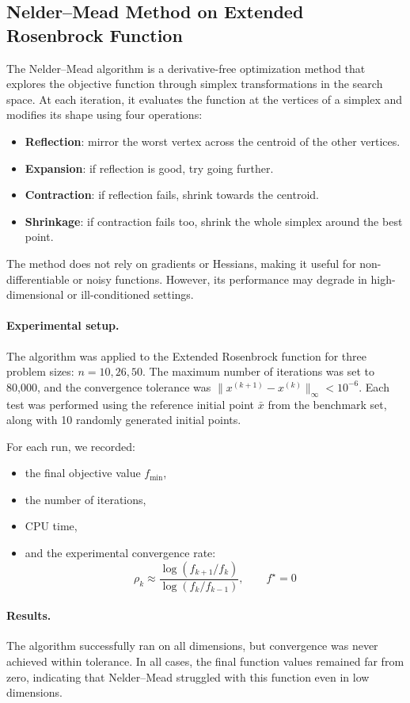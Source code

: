 \documentclass[a4paper,12pt]{article}
\begin{document}
	\subsection{Nelder–Mead Method on Extended Rosenbrock Function}
	
	The Nelder–Mead algorithm is a derivative-free optimization method that explores the objective function through simplex transformations in the search space. At each iteration, it evaluates the function at the vertices of a simplex and modifies its shape using four operations:
	\begin{itemize}[nosep]
		\item \textbf{Reflection}: mirror the worst vertex across the centroid of the other vertices.
		\item \textbf{Expansion}: if reflection is good, try going further.
		\item \textbf{Contraction}: if reflection fails, shrink towards the centroid.
		\item \textbf{Shrinkage}: if contraction fails too, shrink the whole simplex around the best point.
	\end{itemize}
	The method does not rely on gradients or Hessians, making it useful for non-differentiable or noisy functions. However, its performance may degrade in high-dimensional or ill-conditioned settings.
	
	\paragraph{Experimental setup.}
	The algorithm was applied to the Extended Rosenbrock function for three problem sizes: \(n = 10, 26, 50\). The maximum number of iterations was set to 80,000, and the convergence tolerance was \( \|x^{(k+1)} - x^{(k)}\|_\infty < 10^{-6} \). Each test was performed using the reference initial point \( \bar{x} \) from the benchmark set, along with 10 randomly generated initial points.
	
	For each run, we recorded:
	\begin{itemize}[nosep]
		\item the final objective value \( f_{\min} \),
		\item the number of iterations,
		\item CPU time,
		\item and the experimental convergence rate:
		\[
		\rho_k \approx \frac{\log(f_{k+1}/f_k)}{\log(f_k / f_{k-1})}, \qquad f^\star = 0
		\]
	\end{itemize}
	\newpage
	\paragraph{Results.}
	The algorithm successfully ran on all dimensions, but convergence was never achieved within tolerance. In all cases, the final function values remained far from zero, indicating that Nelder–Mead struggled with this function even in low dimensions.
	
\end{document}
